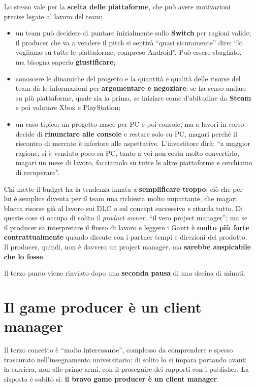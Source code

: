 Lo stesso vale per la \textbf{scelta delle piattaforme}, che può avere
motivazioni precise legate al lavoro del team:
\begin{itemize}
  \item un team può decidere di puntare inizialmente sullo \textbf{Switch} per
        ragioni valide; il producer che va a vendere il pitch si sentirà ``quasi
        sicuramente'' dire: ``lo vogliamo su tutte le piattaforme, compreso
        Android''. Può essere sbagliato, ma bisogna saperlo
        \textbf{giustificare};
  \item conoscere le dinamiche del progetto e la quantità e qualità delle
        risorse del team dà le informazioni per \textbf{argomentare e
        negoziare}: se ha senso andare su più piattaforme, quale sia la prima,
        se iniziare come d'abitudine da \textbf{Steam} e poi valutare Xbox e
        PlayStation;
  \item un caso tipico: un progetto nasce per PC e poi console, ma a lavori in
        corso decide di \textbf{rinunciare alle console} e restare solo su PC,
        magari perché il riscontro di mercato è inferiore alle aspettative.
        L'investitore dirà: ``a maggior ragione, si è venduto poco su PC, tanto
        a voi non costa molto convertirlo, magari un mese di lavoro, facciamolo
        su tutte le altre piattaforme e cerchiamo di recuperare''.
\end{itemize}
Chi mette il budget ha la tendenza innata a \textbf{semplificare troppo}: ciò
che per lui è semplice diventa per il team una richiesta molto impattante, che
magari blocca risorse già al lavoro sui DLC o sul concept successivo e ritarda
tutto. Di queste cose si occupa di solito il \emph{product owner}, ``il vero
project manager''; ma se il producer sa interpretare il flusso di lavoro e
leggere i Gantt è \textbf{molto più forte contrattualmente} quando discute con i
partner tempi e direzioni del prodotto. Il producer, quindi, non è davvero un
project manager, ma \textbf{sarebbe auspicabile che lo fosse}.

Il terzo punto viene rinviato dopo una \textbf{seconda pausa} di una decina di
minuti.

\section{Il game producer è un client manager}
\label{sec:z5-client-manager}

Il terzo concetto è ``molto interessante'', complesso da comprendere e spesso
trascurato nell'insegnamento universitario: di solito lo si impara portando
avanti la carriera, non alle prime armi, con il proseguire dei rapporti con i
publisher. La risposta è subito sì: \textbf{il bravo game producer è un client
manager}.

